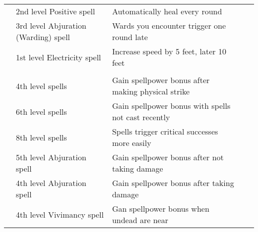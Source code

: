 \begin{longtabuwrapper}
\begin{longtabu}{>{\lcol}p{10em} >{\lcol}p{15em} >{\lcol}X >{\lcol}p{8em} >{\lcol}p{3em}}
         & 2nd level Positive spell & Automatically heal every round & \x &  \\
         & 3rd level Abjuration (Warding) spell & Wards you encounter trigger one round late & \x &  \\
         & 1st level Electricity spell & Increase speed by 5 feet, later 10 feet & \x &  \\

        \midrule
         &  &  &   \\
         & 4th level spells & Gain spellpower bonus after making physical strike & \x &  \\
         & 6th level spells & Gain spellpower bonus with spells not cast recently & \x &  \\
         & 8th level spells & Spells trigger critical successes more easily & \x &  \\
         & 5th level Abjuration spell & Gain spellpower bonus after not taking damage & \x &  \\
         & 4th level Abjuration spell & Gain spellpower bonus after taking damage & \x &  \\
         & 4th level Vivimancy spell & Gan spellpower bonus when undead are near & \x &  \\


\end{longtabu}
\end{longtabuwrapper}
